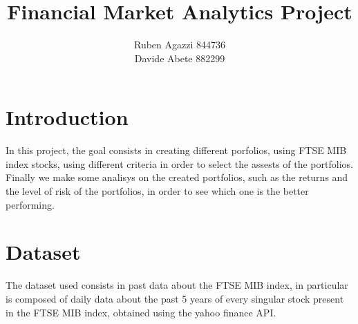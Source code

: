 \documentclass[12pt, a4paper, twocolumn]{article} %
\title{Financial Market Analytics Project} %
\author{
    Ruben Agazzi 844736\\
		Davide Abete 882299
}
\begin{document}


\thispagestyle{firstpage} %


\bigskip

\clearpage
\bigskip
\tableofcontents



	
	
	
	\tableofcontents
	\section{Introduction} 
	In this project, the goal consists in creating different porfolios, using FTSE MIB index stocks, using different criteria in order to select the assests of the portfolios. Finally we make some analisys on the created portfolios, such as the returns and the level of risk of the portfolios, in order to see which one is the better performing.
	\section{Dataset}
	The dataset used consists in past data about the FTSE MIB index, in particular is composed of daily data about the past 5 years of every singular stock present in the FTSE MIB index, obtained using the yahoo finance API.
\end{document}
